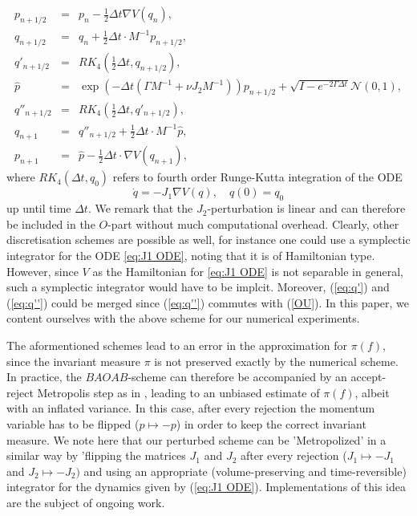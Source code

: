 \begin{subequations}
\begin{eqnarray}
p_{n+1/2} 	& = & p_{n}-\frac{1}{2}\Delta t\nabla V(q_{n}),\\
q_{n+1/2}	& = & q_{n}+\frac{1}{2}\Delta t\cdot M^{-1}p_{n+1/2},\\
q'_{n+1/2}	& = & RK_{4}(\frac{1}{2}\Delta t,q_{n+1/2})\label{eq:q'},\\
\hat{p}		& = & \exp(-\Delta t(\Gamma M^{-1}+\nu J_{2}M^{-1}))p_{n+1/2}+\sqrt{I-e^{-2\Gamma\Delta t}}\mathcal{N}(0,1)\label{OU},\\
q''_{n+1/2}	& = & RK_{4}(\frac{1}{2}\Delta t,q'_{n+1/2})\label{eq:q''},\\
q_{n+1}		& = & q''_{n+1/2}+\frac{1}{2}\Delta t\cdot M^{-1}\hat{p},\\
p_{n+1}		& = & \hat{p}-\frac{1}{2}\Delta t\cdot\nabla V(q_{n+1}),
\end{eqnarray}
\end{subequations}
where $RK_{4}(\Delta t,q_{0})$
refers to fourth order Runge-Kutta integration of the ODE 
\begin{equation}
\dot{q}=-J_{1}\nabla V(q), \quad q(0)=q_0\label{eq:J1 ODE}
\end{equation}
up until time $\Delta t$.
We remark that the $J_{2}$-perturbation is linear and can therefore be
included in the $O$-part without much computational overhead. Clearly,
other discretisation schemes are possible as well, for instance one could use a symplectic integrator for the ODE \eqref{eq:J1 ODE}, noting that it is of Hamiltonian type. However, since $V$ as the Hamiltonian for \eqref{eq:J1 ODE} is not separable in general, such a symplectic integrator would have to be implcit. Moreover, (\ref{eq:q'}) and (\ref{eq:q''})
could be merged since (\ref{eq:q''}) commutes with (\ref{OU}). In
this paper, we content ourselves with the above scheme for our numerical
experiments.
\begin{remark}
	The aformentioned schemes lead to an error in the approximation
	for $\pi(f)$, since the invariant measure $\pi$ is not preserved
	exactly by the numerical scheme. In practice, the $BAOAB$-scheme
	can therefore be accompanied by an accept-reject Metropolis step as in \cite{BAOABMetropolis},
	leading to an unbiased estimate of $\pi(f)$, albeit with an inflated
	variance. In this case, after every rejection the momentum variable
	has to be flipped ($p\mapsto-p$) in order to keep the correct invariant
	measure. We note here that our perturbed scheme can be 'Metropolized'
	in a similar way by 'flipping the matrices $J_{1}$ and $J_{2}$ after
	every rejection ($J_{1}\mapsto-J_{1}$ and $J_{2}\mapsto-J_{2})$
	and using an appropriate (volume-preserving and time-reversible) integrator for the
	dynamics given by (\ref{eq:J1 ODE}). Implementations of this idea are the subject of ongoing work.
\end{remark}



